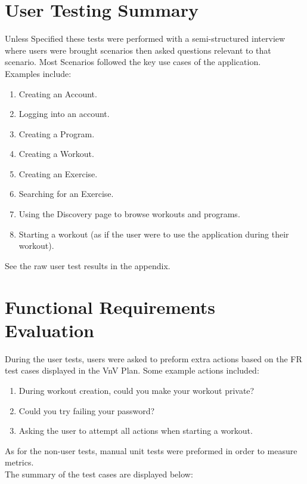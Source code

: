 \documentclass[12pt, titlepage]{article}
\begin{document}
\section{User Testing Summary}
Unless Specified these tests were performed with a semi-structured interview where users were brought scenarios then asked questions relevant to that scenario. Most Scenarios followed the key use cases of the application.\\
Examples include:
\begin{enumerate}
	\item Creating an Account.
	\item Logging into an account.
	\item Creating a Program.
	\item Creating a Workout.
	\item Creating an Exercise.
	\item Searching for an Exercise.
	\item Using the Discovery page to browse workouts and programs.
	\item Starting a workout (as if the user were to use the application during their workout).
\end{enumerate}

See the raw user test results in the appendix.

\section{Functional Requirements Evaluation}


\noindent During the user tests, users were asked to preform extra actions based on the FR test cases displayed in the VnV Plan.
Some example actions included: \\
\begin{enumerate}
    \item During workout creation, could you make your workout private?
    \item Could you try failing your password?
    \item Asking the user to attempt all actions when starting a workout.
\end{enumerate}


\noindent As for the non-user tests, manual unit tests were preformed in order to measure metrics.\\


\noindent The summary of the test cases are displayed below:
\end{document}
